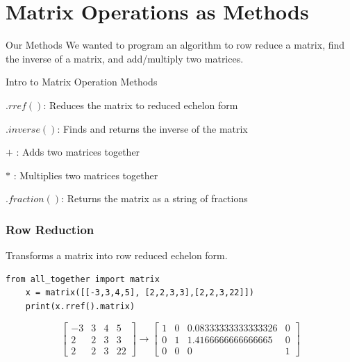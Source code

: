 \documentclass{beamer}
\begin{document}
\section{Matrix Operations as Methods}
\begin{frame}{Our Methods}
We wanted to program an algorithm to row reduce a matrix, find the inverse of a matrix, and add/multiply two matrices.
\end{frame}
\begin{frame}{Intro to Matrix Operation Methods}
    \begin{center}
        $.rref()$: Reduces the matrix to reduced echelon form
        
        $.inverse()$: Finds and returns the inverse of the matrix

        $+$ : Adds two matrices together

        $*$ : Multiplies two matrices together

        $.fraction()$: Returns the matrix as a string of fractions
    \end{center}
\end{frame}

\begin{frame}[fragile=singleslide]\frametitle{Row Reduction}
Transforms a matrix into row reduced echelon form.
\begin{verbatim}
from all_together import matrix
    x = matrix([[-3,3,4,5], [2,2,3,3],[2,2,3,22]])
    print(x.rref().matrix) 
\end{verbatim}
\begin{equation*}
\left[
\begin{array}{cccc}
    -3 & 3 & 4 &5   \\
     2&2&3&3 \\
     2&2&3&22
\end{array}
\right]
\rightarrow
\left[
\begin{array}{cccc}
    1 & 0 & 0.08333333333333326 &0   \\
     0&1& 1.4166666666666665&0 \\
     0&0&0&1
\end{array}
\right]
\end{equation*}
\end{frame}
\end{document}
